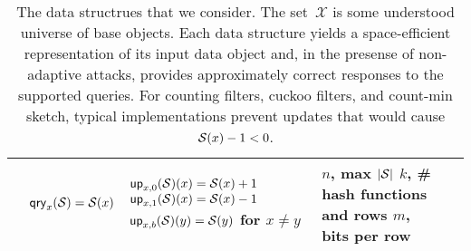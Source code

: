 \begin{table}[t]
\begin{center}
\begin{tabular}{ |p{1.75cm} | p{2.5cm} | p{2.95cm} | p{4cm} | p{3.7cm}|}
          & $\mathsf{qry}_x(\mathcal{S}) = \mathcal{S}(x)$
          & \parbox[c][10ex]{4cm}{$\mathsf{up}_{x,0}(\mathcal{S})(x) = \mathcal{S}(x)+1$ \\ $\mathsf{up}_{x,1}(\mathcal{S})(x) = \mathcal{S}(x)-1$ \\ $\mathsf{up}_{x,b}(\mathcal{S})(y) = \mathcal{S}(y)$ for $x \neq y$}
          & \parbox[c]{3.75cm}{$n$, max $|\mathcal{S}|$\\$k$, \# hash functions and rows\\$m$, bits per row}
          \\ \hline
  \end{tabular}
\caption{The data structrues that we consider.  The set~$\mathcal{X}$ is some understood universe of base objects.  Each data structure yields a space-efficient representation of its input data object and, in the presense of non-adaptive attacks, provides approximately correct responses to the supported queries.  For counting filters, cuckoo filters, and count-min sketch, typical implementations prevent updates that would cause $\mathcal{S}(x)-1 < 0$.}
\end{center}
\end{table}